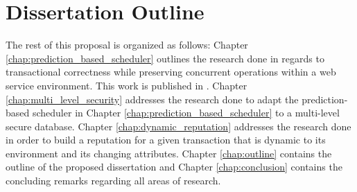 \section{Dissertation Outline}
The rest of this proposal is organized as follows: Chapter \ref{chap:prediction_based_scheduler} outlines the research done in regards to transactional correctness while preserving concurrent operations within a web service environment. This work is published in \cite{ravan_ensuring_2020}. Chapter \ref{chap:multi_level_security} addresses the research done to adapt the prediction-based scheduler in Chapter \ref{chap:prediction_based_scheduler} to a multi-level secure database. Chapter \ref{chap:dynamic_reputation} addresses the research done in order to build a reputation for a given transaction that is dynamic to its environment and its changing attributes. Chapter \ref{chap:outline} contains the outline of the proposed dissertation and Chapter \ref{chap:conclusion} contains the concluding remarks regarding all areas of research.